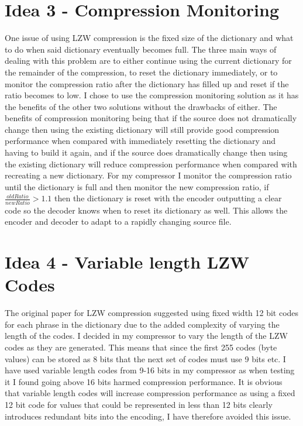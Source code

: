 \documentclass[11pt,a4paper]{article}
\begin{document}
\section*{Idea 3 - Compression Monitoring}
One issue of using LZW compression is the fixed size of the dictionary and what to do when said dictionary eventually becomes full. The three main ways of dealing with this problem are to either continue using the current dictionary for the remainder of the compression, to reset the dictionary immediately, or to monitor the compression ratio after the dictionary has filled up and reset if the ratio becomes to low. I chose to use the compression monitoring solution as it has the benefits of the other two solutions without the drawbacks of either. The benefits of compression monitoring being that if the source does not dramatically change then using the existing dictionary will still provide good compression performance when compared with immediately resetting the dictionary and having to build it again, and if the source does dramatically change then using the existing dictionary will reduce compression performance when compared with recreating a new dictionary. For my compressor I monitor the compression ratio until the dictionary is full and then monitor the new compression ratio, if $\frac{oldRatio}{newRatio} > 1.1$ then the dictionary is reset with the encoder outputting a clear code so the decoder knows when to reset its dictionary as well. This allows the encoder and decoder to adapt to a rapidly changing source file.
\section*{Idea 4 - Variable length LZW Codes}
The original paper for LZW compression\cite{orig} suggested using fixed width 12 bit codes for each phrase in the dictionary due to the added complexity of varying the length of the codes. I decided in my compressor to vary the length of the LZW codes as they are generated. This means that since the first 255 codes (byte values) can be stored as 8 bits that the next set of codes must use 9 bits etc. I have used variable length codes from 9-16 bits in my compressor as when testing it I found going above 16 bits harmed compression performance. It is obvious that variable length codes will increase compression performance as using a fixed 12 bit code for values that could be represented in less than 12 bits clearly introduces redundant bits into the encoding, I have therefore avoided this issue.
\end{document}
